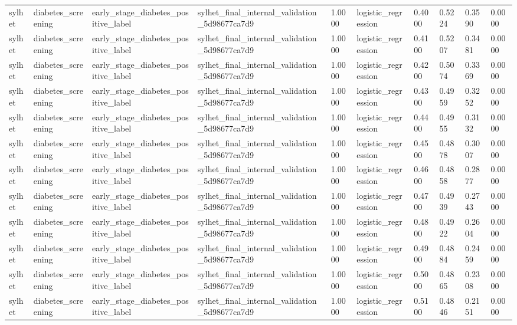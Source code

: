\begin{tabular}{llllllllll}
sylhet & diabetes\_screening & early\_stage\_diabetes\_positive\_label & sylhet\_final\_internal\_validation\_5d98677ca7d9 & 1.0000 & logistic\_regression & 0.4000 & 0.5224 & 0.3590 & 0.0000 \\
sylhet & diabetes\_screening & early\_stage\_diabetes\_positive\_label & sylhet\_final\_internal\_validation\_5d98677ca7d9 & 1.0000 & logistic\_regression & 0.4100 & 0.5207 & 0.3481 & 0.0000 \\
sylhet & diabetes\_screening & early\_stage\_diabetes\_positive\_label & sylhet\_final\_internal\_validation\_5d98677ca7d9 & 1.0000 & logistic\_regression & 0.4200 & 0.5074 & 0.3369 & 0.0000 \\
sylhet & diabetes\_screening & early\_stage\_diabetes\_positive\_label & sylhet\_final\_internal\_validation\_5d98677ca7d9 & 1.0000 & logistic\_regression & 0.4300 & 0.4959 & 0.3252 & 0.0000 \\
sylhet & diabetes\_screening & early\_stage\_diabetes\_positive\_label & sylhet\_final\_internal\_validation\_5d98677ca7d9 & 1.0000 & logistic\_regression & 0.4400 & 0.4955 & 0.3132 & 0.0000 \\
sylhet & diabetes\_screening & early\_stage\_diabetes\_positive\_label & sylhet\_final\_internal\_validation\_5d98677ca7d9 & 1.0000 & logistic\_regression & 0.4500 & 0.4878 & 0.3007 & 0.0000 \\
sylhet & diabetes\_screening & early\_stage\_diabetes\_positive\_label & sylhet\_final\_internal\_validation\_5d98677ca7d9 & 1.0000 & logistic\_regression & 0.4600 & 0.4858 & 0.2877 & 0.0000 \\
sylhet & diabetes\_screening & early\_stage\_diabetes\_positive\_label & sylhet\_final\_internal\_validation\_5d98677ca7d9 & 1.0000 & logistic\_regression & 0.4700 & 0.4939 & 0.2743 & 0.0000 \\
sylhet & diabetes\_screening & early\_stage\_diabetes\_positive\_label & sylhet\_final\_internal\_validation\_5d98677ca7d9 & 1.0000 & logistic\_regression & 0.4800 & 0.4922 & 0.2604 & 0.0000 \\
sylhet & diabetes\_screening & early\_stage\_diabetes\_positive\_label & sylhet\_final\_internal\_validation\_5d98677ca7d9 & 1.0000 & logistic\_regression & 0.4900 & 0.4884 & 0.2459 & 0.0000 \\
sylhet & diabetes\_screening & early\_stage\_diabetes\_positive\_label & sylhet\_final\_internal\_validation\_5d98677ca7d9 & 1.0000 & logistic\_regression & 0.5000 & 0.4865 & 0.2308 & 0.0000 \\
sylhet & diabetes\_screening & early\_stage\_diabetes\_positive\_label & sylhet\_final\_internal\_validation\_5d98677ca7d9 & 1.0000 & logistic\_regression & 0.5100 & 0.4846 & 0.2151 & 0.0000 \\

\end{tabular}
